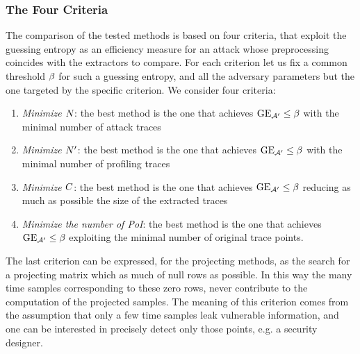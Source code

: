 \subsubsection{The Four Criteria}
The comparison of the tested methods is based on four criteria, that exploit the guessing entropy as an efficiency measure for an attack whose preprocessing coincides with the extractors to compare. For each criterion let us fix a common threshold $\threshold$ for such a guessing entropy, and all the adversary parameters but the one targeted by the specific criterion. We consider four criteria: 
\begin{enumerate}
\item {\em Minimize $\numTraces[]$}: the best method is the one that achieves $\guessingEntropy_{\adversary'}\leq \threshold$ with the minimal number of attack traces
\item {\em Minimize $\numTraces[]'$}: the best method is the one that achieves $\guessingEntropy_{\adversary'}\leq \threshold$ with the minimal number of profiling traces
\item {\em Minimize $\newTraceLength$}: the best method is the one that achieves $\guessingEntropy_{\adversary'}\leq \threshold$ reducing as much as possible the size of the extracted traces
\item {\em Minimize the number of PoI}: the best method is the one that achieves $\guessingEntropy_{\adversary'}\leq \threshold$ exploiting the minimal number of original trace points.
\end{enumerate}
The last criterion can be expressed, for the projecting methods, as the search for a projecting matrix which as much of null rows as possible. In this way the many time samples corresponding to these zero rows, never contribute to the computation of the projected samples. The meaning of this criterion comes from the assumption that only a few time samples leak vulnerable information, and one can be interested in precisely detect only those points, e.g. a security designer.













